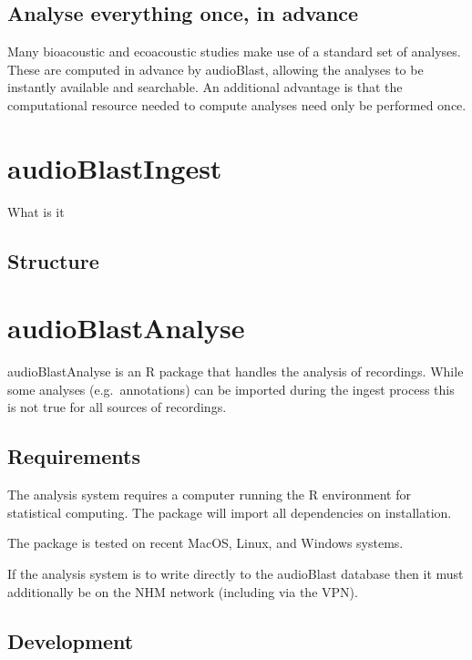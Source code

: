 \documentclass[
]{book}
\begin{document}
\hypertarget{analyse-everything-once-in-advance}{%
\section{Analyse everything once, in advance}\label{analyse-everything-once-in-advance}}

Many bioacoustic and ecoacoustic studies make use of a standard set of analyses. These are computed in advance by audioBlast, allowing the analyses to be instantly available and searchable. An additional advantage is that the computational resource needed to compute analyses need only be performed once.

\hypertarget{audioblastingest}{%
\chapter{audioBlastIngest}\label{audioblastingest}}

What is it

\hypertarget{structure}{%
\section{Structure}\label{structure}}

\hypertarget{audioblastanalyse}{%
\chapter{audioBlastAnalyse}\label{audioblastanalyse}}

audioBlastAnalyse is an R package that handles the analysis of recordings. While some analyses (e.g.~annotations) can be imported during the ingest process this is not true for all sources of recordings.

\hypertarget{requirements}{%
\section{Requirements}\label{requirements}}

The analysis system requires a computer running the R environment for statistical computing. The package will import all dependencies on installation.

The package is tested on recent MacOS, Linux, and Windows systems.

If the analysis system is to write directly to the audioBlast database then it must additionally be on the NHM network (including via the VPN).

\hypertarget{development}{%
\section{Development}\label{development}}
\end{document}
